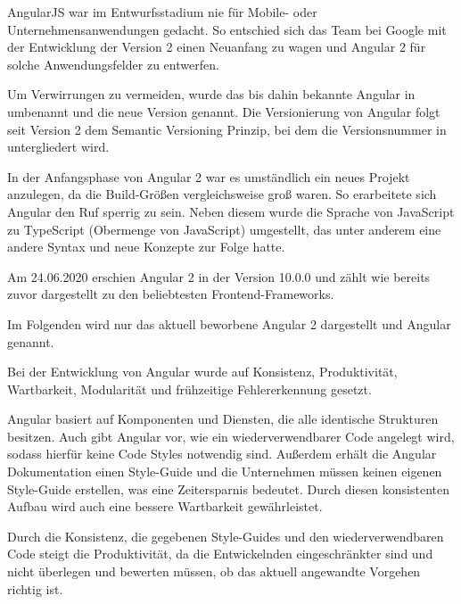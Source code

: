 AngularJS war im Entwurfsstadium nie für Mobile- oder Unternehmensanwendungen gedacht.
So entschied sich das Team bei Google mit der Entwicklung der Version 2 einen Neuanfang zu wagen und Angular 2 für solche Anwendungsfelder zu entwerfen. \cite{gaviganHistoryAngular2018}

Um Verwirrungen zu vermeiden, wurde das bis dahin bekannte Angular in  umbenannt und die neue Version  genannt. Die Versionierung von Angular folgt seit Version 2 dem Semantic Versioning Prinzip, bei dem die Versionsnummer in \linebreak {} untergliedert wird. \cite{gaviganHistoryAngular2018} 

In der Anfangsphase von Angular 2 war es umständlich ein neues Projekt anzulegen, da die Build-Größen vergleichsweise groß waren. So erarbeitete sich Angular den Ruf sperrig zu sein.
Neben diesem wurde die Sprache von JavaScript zu TypeScript (Obermenge von JavaScript) umgestellt, das unter anderem eine andere Syntax und neue Konzepte zur Folge hatte. \cite{gaviganHistoryAngular2018}

Am 24.06.2020 erschien Angular 2 in der Version 10.0.0 \cite{googleAngularAngularVersioning2020} und zählt wie bereits zuvor dargestellt zu den beliebtesten Frontend-Frameworks.

Im Folgenden wird nur das aktuell beworbene Angular 2 dargestellt und Angular genannt.

Bei der Entwicklung von Angular wurde auf Konsistenz, Produktivität, Wartbarkeit, Modularität und frühzeitige Fehlererkennung gesetzt.

Angular basiert auf Komponenten und Diensten, die alle identische Strukturen besitzen. Auch gibt Angular vor, wie ein wiederverwendbarer Code angelegt wird, sodass hierfür keine Code Styles notwendig sind. Außerdem erhält die Angular Dokumentation einen Style-Guide und die Unternehmen müssen keinen eigenen Style-Guide erstellen, was eine Zeitersparnis bedeutet. Durch diesen konsistenten Aufbau wird auch eine bessere Wartbarkeit gewährleistet. \cite{wahlinWesentlichenVorteileAngular2017}

Durch die Konsistenz, die gegebenen Style-Guides und den wiederverwendbaren Code steigt die Produktivität, da die Entwickelnden eingeschränkter sind und nicht überlegen und bewerten müssen, ob das aktuell angewandte Vorgehen richtig ist.  \cite{wahlinWesentlichenVorteileAngular2017}


